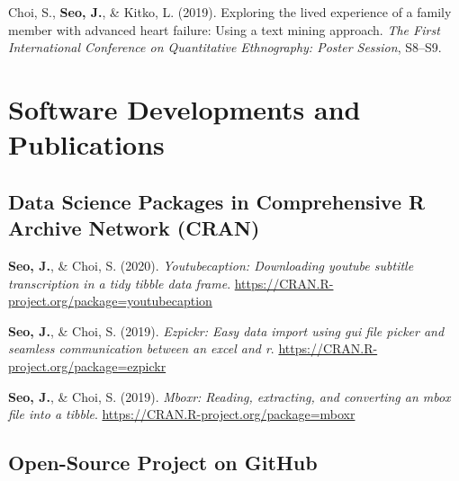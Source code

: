 \documentclass[11pt, a4paper]{awesome-cv}
\begin{document}
\leavevmode\hypertarget{ref-choi2019exploring}{}%
Choi, S., \textbf{Seo, J.}, \& Kitko, L. (2019). Exploring the lived experience of a family member with advanced heart failure: Using a text mining approach. \emph{The First International Conference on Quantitative Ethnography: Poster Session}, S8--S9.

\endgroup

\hypertarget{software-developments-and-publications}{%
\section{Software Developments and Publications}\label{software-developments-and-publications}}

\hypertarget{data-science-packages-in-comprehensive-r-archive-network-cran}{%
\subsection{Data Science Packages in Comprehensive R Archive Network (CRAN)}\label{data-science-packages-in-comprehensive-r-archive-network-cran}}

\begingroup
\setlength{\parindent}{-0.5in}
\setlength{\leftskip}{0.5in}

\hypertarget{refs_R_packages}{}
\leavevmode\hypertarget{ref-R-youtubecaption}{}%
\textbf{Seo, J.}, \& Choi, S. (2020). \emph{Youtubecaption: Downloading youtube subtitle transcription in a tidy tibble data frame}. \url{https://CRAN.R-project.org/package=youtubecaption}

\leavevmode\hypertarget{ref-R-ezpickr}{}%
\textbf{Seo, J.}, \& Choi, S. (2019). \emph{Ezpickr: Easy data import using gui file picker and seamless communication between an excel and r}. \url{https://CRAN.R-project.org/package=ezpickr}

\leavevmode\hypertarget{ref-R-mboxr}{}%
\textbf{Seo, J.}, \& Choi, S. (2019). \emph{Mboxr: Reading, extracting, and converting an mbox file into a tibble}. \url{https://CRAN.R-project.org/package=mboxr}

\endgroup

\hypertarget{open-source-project-on-github}{%
\subsection{Open-Source Project on GitHub}\label{open-source-project-on-github}}

\begingroup
\setlength{\parindent}{-0.5in}
\setlength{\leftskip}{0.5in}
\end{document}
